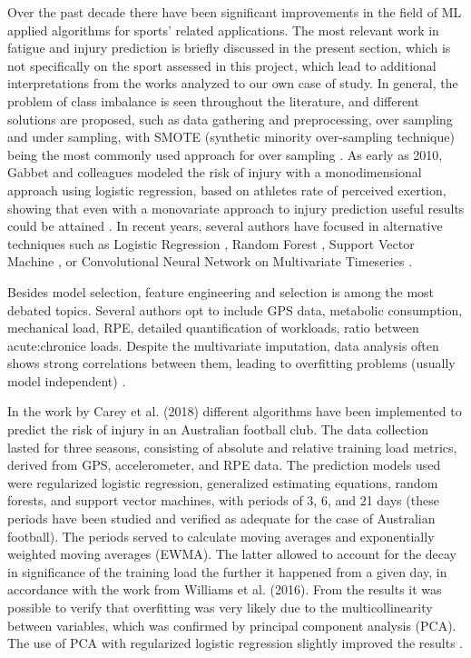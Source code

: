\documentclass[conference]{IEEEtran}
\begin{document}
Over the past decade there have been significant improvements in the field of ML applied algorithms for sports' related applications. The most relevant work in fatigue and injury prediction is briefly discussed in the present section, which is not specifically on the sport assessed in this project, which lead to additional interpretations from the works analyzed to our own case of study. In general, the problem of class imbalance is seen throughout the literature, and different solutions are proposed, such as data gathering and preprocessing, over sampling and under sampling, with SMOTE (synthetic minority over-sampling technique) being the most commonly used approach for over sampling \cite{Rossi2022}. As early as 2010, Gabbet and colleagues modeled the risk of injury with a monodimensional approach using logistic regression, based on athletes rate of perceived exertion, showing that even with a monovariate approach to injury prediction useful results could be attained \cite{Gabbett2010}. In recent years, several authors have focused in alternative techniques such as Logistic Regression \cite{murray2017calculating}, Random Forest \cite{Vallance2020}, Support Vector Machine \cite{Carey_2018}, or Convolutional Neural Network on Multivariate Timeseries \cite{pappalardo2019explainable}.

Besides model selection, feature engineering and selection is among the most debated topics. Several authors opt to include GPS data, metabolic consumption, mechanical load, RPE, detailed quantification of workloads, ratio between acute:chronice loads. Despite the multivariate imputation, data analysis often shows strong correlations between them, leading to overfitting problems (usually model independent) \cite{Rossi2022}.

In the work by Carey et al. (2018) different algorithms have been implemented to predict the risk of injury in an Australian football club. The data collection lasted for three seasons, consisting of absolute and relative training load metrics, derived from GPS, accelerometer, and RPE data. The prediction models used were regularized logistic regression, generalized estimating equations, random forests, and support vector machines, with periods of 3, 6, and 21 days (these periods have been studied and verified as adequate for the case of Australian football). The periods served to calculate moving averages and exponentially weighted moving averages (EWMA). The latter allowed to account for the decay in significance of the training load the further it happened from a given day, in accordance with the work from Williams et al. (2016). From the results it was possible to verify that overfitting was very likely due to the multicollinearity between variables, which was confirmed by principal component analysis (PCA). The use of PCA with regularized logistic regression slightly improved the results \cite{Carey_2018}.
\end{document}
